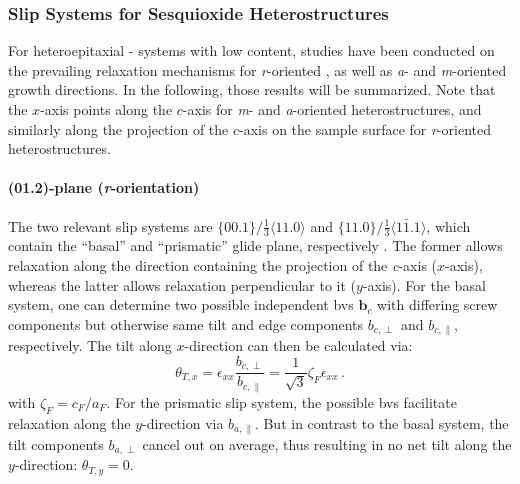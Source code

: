 \subsubsection{Slip Systems for Sesquioxide Heterostructures}
For heteroepitaxial - systems with low  content, studies have been conducted on the prevailing relaxation mechanisms for \textit{r}-oriented
    \cite{grundmann2020b,grundmann2020a},
as well as \textit{a}- and \textit{m}-oriented
    \cite{kneiss2021}
growth directions.
In the following, those results will be summarized.
Note that the $x$-axis points along the $c$-axis for \textit{m}- and \textit{a}-oriented he\-terostructures, and similarly along the projection of the $c$-axis on the sample surface for \textit{r}-oriented heterostructures.

\paragraph{(01.2)-plane (\textit{r}-orientation)}
The two relevant slip systems are $\{00.1\}/\frac{1}{3}\langle11.0\rangle$ and $\{11.0\}/\frac{1}{3}\langle1\bar{1}.1\rangle$, which contain the \enquote{basal} and \enquote{prismatic} glide plane, respectively
    \cite{grundmann2020b}.
The former allows relaxation along the direction containing the projection of the \textit{c}-axis ($x$-axis), whereas the latter allows relaxation perpendicular to it ($y$-axis).
For the basal system, one can determine two possible independent \glspl{bv} $\mathbf{b}_c$ with differing screw components but otherwise same tilt and edge components $b_{c,\perp}$ and $b_{c,\parallel}$, respectively.
The tilt along $x$-direction can then be calculated via:
\begin{equation}
    \theta_{T,x}=\epsilon_{xx}\frac{b_{c,\perp}}{b_{c,\parallel}}=\frac{1}{\sqrt{3}}\zeta_F\epsilon_{xx}\,.
\end{equation}
with $\zeta_F=c_F/a_F$.
For the prismatic slip system, the possible \glspl{bv} facilitate relaxation along the $y$-direction via $b_{a,\parallel}$.
But in contrast to the basal system, the tilt components $b_{a,\perp}$ cancel out on average, thus resulting in no net tilt along the $y$-direction: $\theta_{T,y}=0$.

